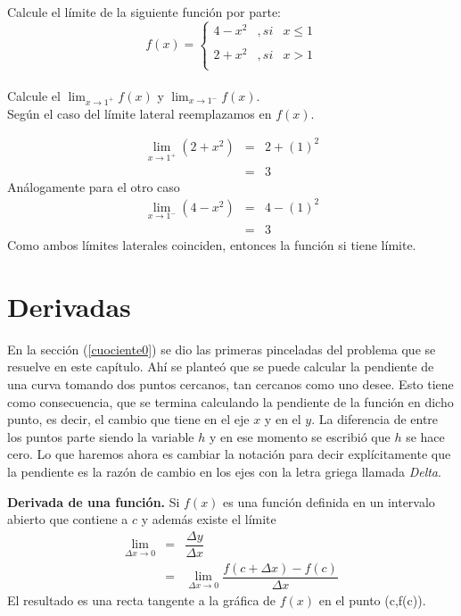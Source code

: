 \begin{myexample}
Calcule el límite de la siguiente función por parte:\\

\[ f(x)= \left\{ \begin{array}{lcc} 
             4-x^{2} &   , si  & x\leq 1 \\
             \\ 2+x^{2} &  , si & x>1 \\
             \end{array}
   \right.\]\\
Calcule el $ \lim_{x\to 1^{+}}f(x)$ y $ \lim_{x\to 1^{-}}f(x)$.\\ %

Según el caso del límite lateral reemplazamos en $f(x)$.

\begin{eqnarray*}
\lim_{x\to 1^{+}}(2+x^{2})&=& 2+(1)^{2}\\
&=& 3
\end{eqnarray*}
Análogamente para el otro caso
\begin{eqnarray*}
\lim_{x\to 1^{-}}(4-x^{2})&=& 4-(1)^{2}\\
&=& 3
\end{eqnarray*}
Como ambos límites laterales coinciden, entonces la función si tiene límite.
\end{myexample}

\section{Derivadas}

En la sección (\ref{cuociente0}) se dio las primeras pinceladas del problema que se resuelve en este capítulo. Ahí se planteó que se puede calcular  la pendiente de una curva tomando dos puntos cercanos, tan cercanos como uno desee. Esto tiene como consecuencia, que se termina calculando la pendiente de la función en dicho punto, es decir, el cambio que tiene en el eje $x$ y en el $y$. La diferencia de entre los puntos parte siendo la variable $h$ y en ese momento se escribió que $h$ se hace cero. Lo que haremos ahora es cambiar la notación para decir explícitamente que la pendiente es la razón de cambio en los ejes con la letra griega llamada \textit{Delta}.
\begin{mydef}
\textbf{Derivada de una función. } Si $f(x)$ es una función definida en un intervalo abierto que contiene a $c$ y además existe el límite
\begin{eqnarray}
\lim_{\Delta x\rightarrow 0 } &=&\dfrac{\Delta y}{\Delta x}\\
&=&  \lim_{\Delta x\rightarrow 0 }\dfrac{f(c+\Delta x)-f(c)}{\Delta x}
\label{limite0}
\end{eqnarray}
El resultado es una recta tangente a la gráfica de $f(x)$ en el punto (c,f(c)).
\end{mydef}

